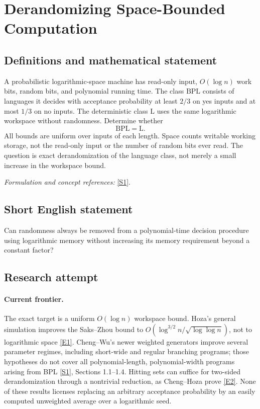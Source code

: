 \documentclass[11pt,a4paper]{article}
\newcommand{\sref}[2]{\hyperlink{source:#1:#2}{[S#2]}}
\newcommand{\eref}[2]{\hyperlink{extra:#1:#2}{[E#2]}}
\newif\ifshowcatalogue
\newcommand{\cataloguescope}[1]{\ifshowcatalogue
 \paragraph{Exact scope in the supplied catalogue.}
 \begin{quote}\small #1\end{quote}\fi}
\numberwithin{equation}{section}
\begin{document}
\setcounter{section}{0}
\clearpage
\section*{\texorpdfstring{Derandomizing Space-Bounded Computation}{Derandomizing Space-Bounded Computation}}\label{statement}
\subsection{Definitions and mathematical statement}
A probabilistic logarithmic-space machine has read-only input, $O(\log n)$ work bits, random bits, and polynomial running time. The class $\mathrm{BPL}$ consists of languages it decides with acceptance probability at least $2/3$ on yes inputs and at most $1/3$ on no inputs. The deterministic class $\mathrm L$ uses the same logarithmic workspace without randomness. Determine whether
\[
 \mathrm{BPL}=\mathrm L.
\]
All bounds are uniform over inputs of each length. Space counts writable working storage, not the read-only input or the number of random bits ever read. The question is exact derandomization of the language class, not merely a small increase in the workspace bound.
\par\smallskip\textit{Formulation and concept references:} \sref{statement}{1}.
\cataloguescope{Prove or disprove that every language decidable by a probabilistic Turing machine using O(log n) workspace, polynomial time, and bounded two-sided error is decidable by a deterministic Turing machine using O(log n) workspace.}
\subsection{Short English statement}
Can randomness always be removed from a polynomial-time decision procedure using logarithmic memory without increasing its memory requirement beyond a constant factor?
\subsection{Research attempt}

\paragraph{Current frontier.}
The exact target is a uniform $O(\log n)$ workspace bound. Hoza's general
simulation improves the Saks--Zhou bound to
$O(\log^{3/2}n/\sqrt{\log\log n})$, not to logarithmic space
\eref{statement}{1}. Cheng--Wu's newer weighted generators improve several
parameter regimes, including short-wide and regular branching programs;
those hypotheses do not cover all polynomial-length, polynomial-width
programs arising from BPL \sref{statement}{1}, Sections 1.1--1.4. Hitting sets
can suffice for two-sided derandomization through a nontrivial reduction,
as Cheng--Hoza prove \eref{statement}{2}. None of these results licenses
replacing an arbitrary acceptance probability by an easily computed
unweighted average over a logarithmic seed.
\end{document}
